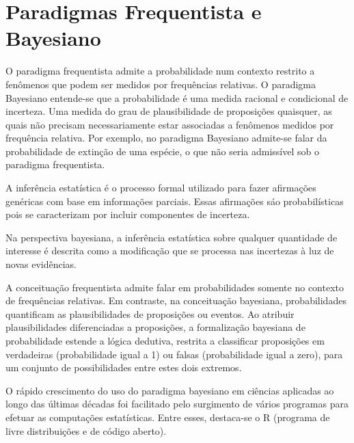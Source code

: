 \section{Paradigmas Frequentista e Bayesiano}

O paradigma frequentista admite a probabilidade num contexto restrito a fenômenos que podem ser medidos por frequências relativas. O paradigma Bayesiano entende-se que a probabilidade é uma medida racional e condicional de incerteza. Uma medida do grau de plausibilidade de proposições quaisquer, as quais não precisam necessariamente estar associadas a fenômenos medidos por frequência relativa. Por exemplo, no paradigma Bayesiano admite-se falar da probabilidade de extinção de uma espécie, o que não seria admissível sob o paradigma frequentista.

A inferência estatística é o processo formal utilizado para fazer afirmações genéricas com base em informações parciais. Essas afirmações sáo probabilísticas pois se caracterizam por incluir componentes de incerteza.

Na perspectiva bayesiana, a inferência estatística sobre qualquer quantidade de interesse é descrita como a modificação que se processa nas incertezas à luz de novas evidências.

A conceituação frequentista admite falar em probabilidades somente no contexto de frequências relativas. Em contraste, na conceituação bayesiana, probabilidades quantificam as plausibilidades de proposições ou eventos. Ao atribuir plausibilidades diferenciadas a proposições, a formalização bayesiana de probabilidade estende a lógica dedutiva, restrita a classificar proposições em verdadeiras (probabilidade igual a 1) ou falsas (probabilidade igual a zero), para um conjunto de possibilidades entre estes dois extremos.

O rápido crescimento do uso do paradigma bayesiano em ciências aplicadas ao longo das últimas décadas foi facilitado pelo surgimento de vários programas para efetuar as computações estatísticas. Entre esses, destaca-se o R (programa de livre distribuições e de código aberto).
